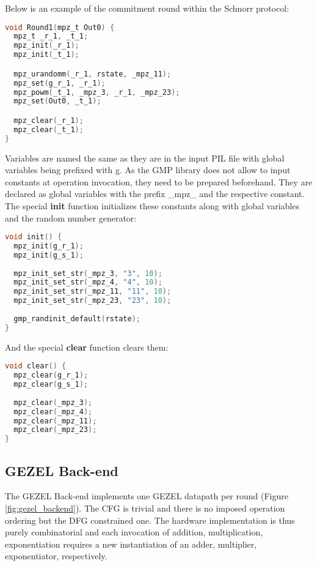 Below is an example of the commitment round within the Schnorr
protocol:
\begin{lstlisting}[language=C]
void Round1(mpz_t Out0) {
  mpz_t _r_1, _t_1;
  mpz_init(_r_1);
  mpz_init(_t_1);

  mpz_urandomm(_r_1, rstate, _mpz_11);
  mpz_set(g_r_1, _r_1);
  mpz_powm(_t_1, _mpz_3, _r_1, _mpz_23);
  mpz_set(Out0, _t_1);

  mpz_clear(_r_1);
  mpz_clear(_t_1);
}
\end{lstlisting}
Variables are named the same as they are in the input PIL file with
global variables being prefixed with g. As the GMP library does not
allow to input constants at operation invocation, they need to be
prepared beforehand. They are declared as global variables with the
prefix \_mpz\_ and the respective constant. The special \textbf{init}
function initializes these constants along with global variables and
the random number generator:
\begin{lstlisting}[language=C]
void init() {
  mpz_init(g_r_1);
  mpz_init(g_s_1);
  
  mpz_init_set_str(_mpz_3, "3", 10);
  mpz_init_set_str(_mpz_4, "4", 10);
  mpz_init_set_str(_mpz_11, "11", 10);
  mpz_init_set_str(_mpz_23, "23", 10);
  
  gmp_randinit_default(rstate);
}
\end{lstlisting}
And the special \textbf{clear} function clears them:
\begin{lstlisting}[language=C]
void clear() {
  mpz_clear(g_r_1);
  mpz_clear(g_s_1);
  
  mpz_clear(_mpz_3);
  mpz_clear(_mpz_4);
  mpz_clear(_mpz_11);
  mpz_clear(_mpz_23);
}
\end{lstlisting}

\subsection{GEZEL Back-end}
\label{subsec:gezel_back_end}

The GEZEL Back-end implements one GEZEL datapath per round (Figure
\ref{fig:gezel_backend}). The CFG is trivial and there is no imposed
operation ordering but the DFG constrained one. The hardware
implementation is thus purely combinatorial and each invocation of
addition, multiplication, exponentiation requires a new instantiation
of an adder, multiplier, exponentiator, respectively.

